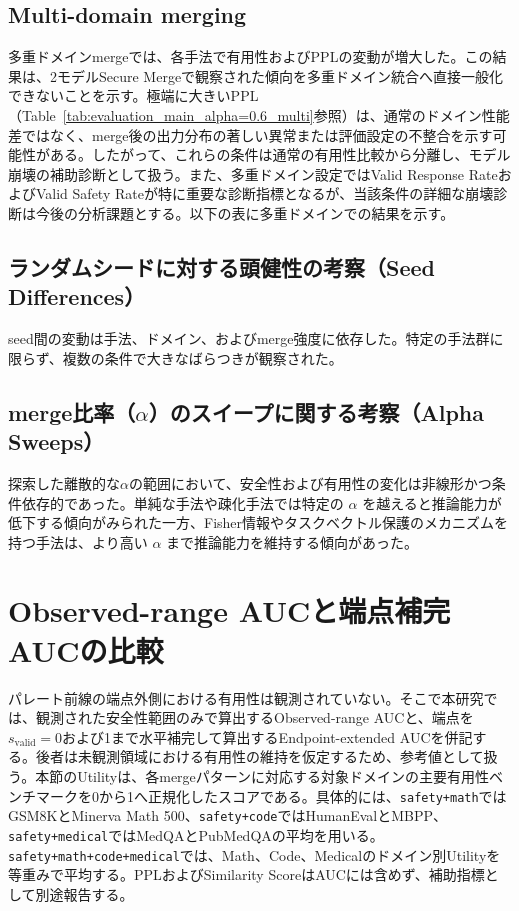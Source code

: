 \documentclass{article}
\begin{document}


\subsection{Multi-domain merging}
多重ドメインmergeでは、各手法で有用性およびPPLの変動が増大した。この結果は、2モデルSecure Mergeで観察された傾向を多重ドメイン統合へ直接一般化できないことを示す。極端に大きいPPL（Table~\ref{tab:evaluation_main_alpha=0.6_multi}参照）は、通常のドメイン性能差ではなく、merge後の出力分布の著しい異常または評価設定の不整合を示す可能性がある。したがって、これらの条件は通常の有用性比較から分離し、モデル崩壊の補助診断として扱う。また、多重ドメイン設定ではValid Response RateおよびValid Safety Rateが特に重要な診断指標となるが、当該条件の詳細な崩壊診断は今後の分析課題とする。以下の表に多重ドメインでの結果を示す。







\subsection{ランダムシードに対する頭健性の考察（Seed Differences）}
seed間の変動は手法、ドメイン、およびmerge強度に依存した。特定の手法群に限らず、複数の条件で大きなばらつきが観察された。

\subsection{merge比率（$\alpha$）のスイープに関する考察（Alpha Sweeps）}
探索した離散的な\(\alpha\)の範囲において、安全性および有用性の変化は非線形かつ条件依存的であった。単純な手法や疎化手法では特定の $\alpha$ を越えると推論能力が低下する傾向がみられた一方、Fisher情報やタスクベクトル保護のメカニズムを持つ手法は、より高い $\alpha$ まで推論能力を維持する傾向があった。

\section{Observed-range AUCと端点補完AUCの比較}
\label{app:observed_range_auc}
パレート前線の端点外側における有用性は観測されていない。そこで本研究では、観測された安全性範囲のみで算出するObserved-range AUCと、端点を\(s_{\mathrm{valid}}=0\)および1まで水平補完して算出するEndpoint-extended AUCを併記する。後者は未観測領域における有用性の維持を仮定するため、参考値として扱う。本節のUtilityは、各mergeパターンに対応する対象ドメインの主要有用性ベンチマークを0から1へ正規化したスコアである。具体的には、\texttt{safety+math}ではGSM8KとMinerva Math 500、\texttt{safety+code}ではHumanEvalとMBPP、\texttt{safety+medical}ではMedQAとPubMedQAの平均を用いる。\texttt{safety+math+code+medical}では、Math、Code、Medicalのドメイン別Utilityを等重みで平均する。PPLおよびSimilarity ScoreはAUCには含めず、補助指標として別途報告する。
\end{document}
